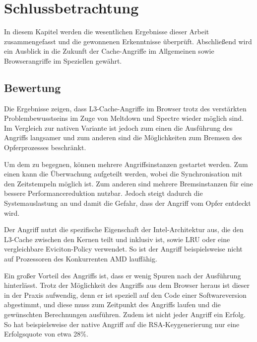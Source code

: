 \chapter{Schlussbetrachtung}
\label{chapter:conclusions}

In diesem Kapitel werden die wesentlichen Ergebnisse dieser Arbeit zusammengefasst und die gewonnenen Erkenntnisse %
überprüft.
Abschließend wird ein Ausblick in die Zukunft der Cache-Angriffe im Allgemeinen sowie Browserangriffe im Speziellen gewährt.

\section{Bewertung}

Die Ergebnisse zeigen, dass L3-Cache-Angriffe im Browser trotz des verstärkten Problembewusstseins im Zuge von Meltdown und Spectre wieder möglich sind.
Im Vergleich zur nativen Variante ist jedoch zum einen die Ausführung des Angriffs langsamer und zum anderen sind die Möglichkeiten zum Bremsen des Opferprozesses beschränkt.

Um dem zu begegnen, können mehrere Angriffsinstanzen gestartet werden.
Zum einen kann die Überwachung aufgeteilt werden, wobei die Synchronisation mit den Zeitstempeln möglich ist.
Zum anderen sind mehrere Bremsinstanzen für eine bessere Performancereduktion nutzbar.
Jedoch steigt dadurch die Systemauslastung an und damit die Gefahr, dass der Angriff vom Opfer entdeckt wird. 


Der Angriff nutzt die spezifische Eigenschaft der Intel-Architektur aus, die den L3-Cache zwischen den Kernen teilt und inklusiv ist, sowie LRU oder eine vergleichbare Eviciton-Policy verwendet. 
So ist der Angriff beispielsweise nicht auf Prozessoren des Konkurrenten AMD lauffähig.

Ein großer Vorteil des Angriffs ist, dass er wenig Spuren nach der Ausführung hinterlässt.
Trotz der Möglichkeit des Angriffs aus dem Browser heraus ist dieser in der Praxis aufwendig, denn er ist speziell auf den Code einer Softwareversion abgestimmt, und diese muss zum Zeitpunkt des Angriffs laufen und die gewünschten Berechnungen ausführen. 
Zudem ist nicht jeder Angriff ein Erfolg. So hat beispielsweise der native Angriff auf die RSA-Keygenerierung \cite{RSAKeyGeneration2} nur eine Erfolgsquote von etwa 28\%.

